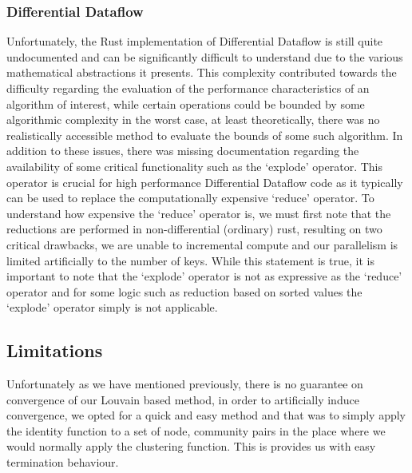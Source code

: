 \subsubsection{Differential Dataflow}
Unfortunately, the Rust implementation of Differential Dataflow is still quite undocumented and can be significantly difficult to understand due to the various mathematical abstractions it presents. This complexity contributed towards the difficulty regarding the evaluation of the performance characteristics of an algorithm of interest, while certain operations could be bounded by some algorithmic complexity in the worst case, at least theoretically, there was no realistically accessible method to evaluate the bounds of some such algorithm. In addition to these issues, there was missing documentation regarding the availability of some critical functionality such as the `explode' operator. This operator is crucial for high performance Differential Dataflow code as it typically can be used to replace the computationally expensive `reduce' operator. To understand how expensive the `reduce' operator is, we must first note that the reductions are performed in non-differential (ordinary) rust, resulting on two critical drawbacks, we are unable to incremental compute and our parallelism is limited artificially to the number of keys. While this statement is true, it is important to note that the `explode' operator is not as expressive as the `reduce' operator and for some logic such as reduction based on sorted values the `explode' operator simply is not applicable.

\subsection{Limitations}
Unfortunately as we have mentioned previously, there is no guarantee on convergence of our Louvain based method, in order to artificially induce convergence, we opted for a quick and easy method and that was to simply apply the identity function to a set of node, community pairs in the place where we would normally apply the clustering function. This is provides us with easy termination behaviour. 